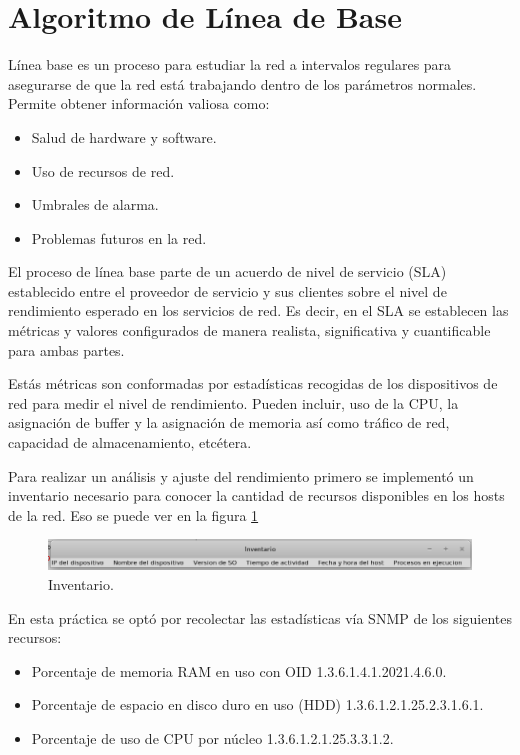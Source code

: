 \section{Algoritmo de Línea de Base}
Línea base es un proceso para estudiar la red a intervalos regulares para asegurarse de que la red está trabajando dentro de los parámetros normales. Permite obtener información valiosa como:

\begin{itemize}
	\item Salud de hardware y software.
	\item Uso de recursos de red.
	\item Umbrales de alarma.
	\item Problemas futuros en la red.
\end{itemize}

El proceso de línea base parte de un acuerdo de nivel de servicio (SLA) establecido entre el proveedor de servicio y sus clientes sobre el nivel de rendimiento esperado en los servicios de red. Es decir, en el SLA se establecen las métricas y valores configurados de manera realista, significativa y cuantificable para ambas partes.

Estás métricas son conformadas por estadísticas recogidas de los dispositivos de red para medir el nivel de rendimiento. Pueden incluir, uso de la CPU, la asignación de buffer y la asignación de memoria así como tráfico de red, capacidad de almacenamiento, etcétera.

Para realizar un análisis y ajuste del rendimiento primero se implementó un inventario necesario para conocer la cantidad de recursos disponibles en los hosts de la red. Eso se puede ver en la figura \ref{image:inventario}

\FloatBarrier
\begin{figure}[htbp!]
		\centering
			\includegraphics[width=.9 \textwidth]{images/inventario}
		\caption{Inventario.}
		\label{image:inventario}
\end{figure}
\FloatBarrier

En esta práctica se optó por recolectar las estadísticas vía SNMP de los siguientes recursos:

\begin{itemize}
	\item Porcentaje de memoria RAM en uso con OID 1.3.6.1.4.1.2021.4.6.0.
	\item Porcentaje de espacio en disco duro en uso (HDD) 1.3.6.1.2.1.25.2.3.1.6.1.
	\item Porcentaje de uso de CPU por núcleo 1.3.6.1.2.1.25.3.3.1.2.
\end{itemize}


